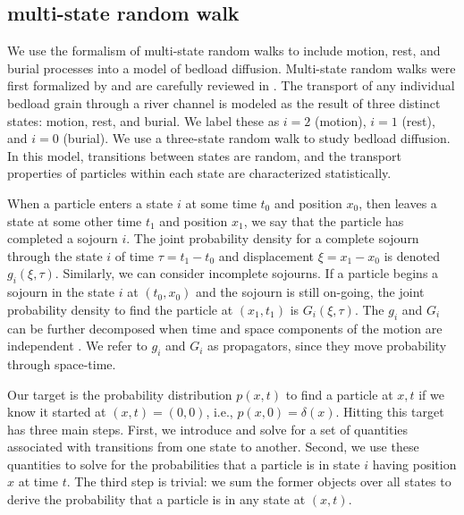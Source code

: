 \documentclass[]{agujournal2018}
\begin{document}
\subsection{multi-state random walk}
We use the formalism of multi-state random walks to include motion, rest, and burial processes into a model of bedload diffusion.
Multi-state random walks were first formalized by \citet{Weiss1976} and are carefully reviewed in \citet{Weiss1994}.
The transport of any individual bedload grain through a river channel is modeled as the result of three distinct states: motion, rest, and burial.
We label these as $i=2$ (motion), $i=1$ (rest), and $i=0$ (burial).
We use a three-state random walk to study bedload diffusion.
In this model, transitions between states are random, and the transport properties of particles within each state are characterized statistically.

When a particle enters a state $i$ at some time $t_0$ and position $x_0$, then leaves a state at some other time $t_1$ and position $x_1$, we say that the particle has completed a sojourn $i$. The joint probability density for a complete sojourn through the state $i$ of time $\tau = t_1-t_0$ and displacement $\xi = x_1-x_0$ is denoted $g_i(\xi,\tau).$ Similarly, we can consider incomplete sojourns. If a particle begins a sojourn in the state $i$ at $(t_0,x_0)$ and the sojourn is still on-going, the joint probability density to find the particle at $(x_1,t_1)$ is $G_i(\xi,\tau)$. The $g_i$ and $G_i$ can be further decomposed when time and space components of the motion are independent \citep{Weiss1994}.
We refer to $g_i$ and $G_i$ as propagators, since they move probability through space-time.

Our target is the probability distribution $p(x,t)$ to find a particle at $x,t$ if we know it started at $(x,t)=(0,0)$, i.e.,  $p(x,0)=\delta(x).$
Hitting this target has three main steps.
First, we introduce and solve for a set of quantities associated with transitions from one state to another.
Second, we use these quantities to solve for the probabilities that a particle is in state $i$ having position $x$ at time $t$.
The third step is trivial: we sum the former objects over all states to derive the probability that a particle is in any state at $(x,t)$.
\end{document}
